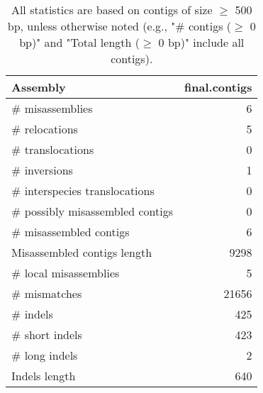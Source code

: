 \documentclass[12pt,a4paper]{article}
\begin{document}
\begin{table}[ht]
\begin{center}
\caption{All statistics are based on contigs of size $\geq$ 500 bp, unless otherwise noted (e.g., "\# contigs ($\geq$ 0 bp)" and "Total length ($\geq$ 0 bp)" include all contigs).}
\begin{tabular}{|l*{1}{|r}|}
\hline
Assembly & final.contigs \\ \hline
\# misassemblies & 6 \\ \hline
\hspace{5mm}\# relocations & 5 \\ \hline
\hspace{5mm}\# translocations & 0 \\ \hline
\hspace{5mm}\# inversions & 1 \\ \hline
\hspace{5mm}\# interspecies translocations & 0 \\ \hline
\# possibly misassembled contigs & 0 \\ \hline
\# misassembled contigs & 6 \\ \hline
Misassembled contigs length & 9298 \\ \hline
\# local misassemblies & 5 \\ \hline
\# mismatches & 21656 \\ \hline
\# indels & 425 \\ \hline
\hspace{5mm}\# short indels & 423 \\ \hline
\hspace{5mm}\# long indels & 2 \\ \hline
Indels length & 640 \\ \hline
\end{tabular}
\end{center}
\end{table}
\end{document}
